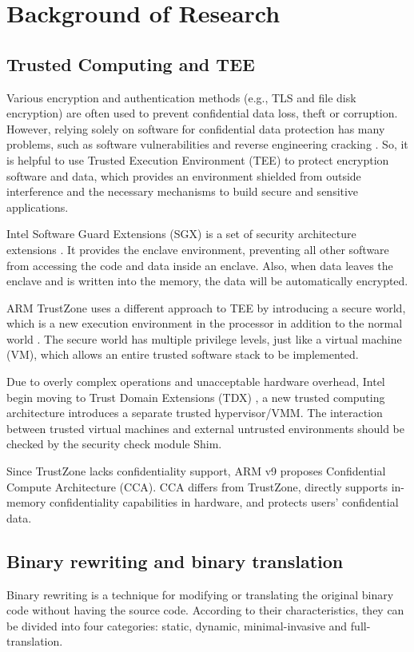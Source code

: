 \section{Background of Research}
\subsection{Trusted Computing and TEE}
Various encryption and authentication methods (e.g., TLS and file disk encryption)
are often used to prevent confidential data loss, theft or corruption.
However, relying solely on software for confidential data protection has many problems,
such as software vulnerabilities and reverse engineering cracking \cite{Zimba2021ARC}.
So, it is helpful to use Trusted Execution Environment (TEE) to protect encryption software
and data, which provides an environment shielded from outside interference and the necessary
mechanisms to build secure and sensitive applications.

Intel Software Guard Extensions (SGX) is a set of security architecture extensions 
\cite{McKeen2013InnovativeIA}.
It provides the enclave environment, preventing all other software from accessing 
the code and data inside an enclave. Also, when data leaves the enclave and is written
into the memory, the data will be automatically encrypted.

ARM TrustZone uses a different approach to TEE by introducing a secure world,
which is a new execution environment in the processor in addition to the normal world
\cite{Mukhtar2019ArchitecturesFS}. The secure world has multiple privilege levels,
just like a virtual machine (VM), which allows an entire trusted software stack to
be implemented.

Due to overly complex operations and unacceptable hardware overhead, Intel begin moving to
Trust Domain Extensions (TDX) \cite{Sahita2021SecurityAO, Sardar2021DemystifyingAI}, a new
trusted computing architecture introduces a separate trusted hypervisor/VMM. The interaction
between trusted virtual machines and external untrusted environments should be checked by the
security check module Shim.

Since TrustZone lacks confidentiality support, ARM v9 proposes Confidential Compute Architecture (CCA).
CCA \cite{CCA} differs from TrustZone, directly supports in-memory confidentiality capabilities in hardware,
and protects users' confidential data.

\subsection{Binary rewriting and binary translation}
Binary rewriting is a technique for modifying or translating the original binary code
without having the source code. According to their characteristics, they can be divided
into four categories: static, dynamic, minimal-invasive and full-translation.

